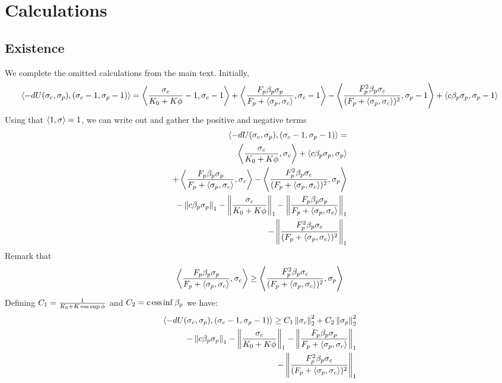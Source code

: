\section{Calculations}
\subsection{Existence}
\label{appendix:calculations}
We complete the omitted calculations from the main text. Initially,
\begin{equation}
  \label{eq:calc_app}
  \ip{-dU(\sigma_c,\sigma_p)}{(\sigma_c-1, \sigma_p-1)} = \ip{\frac{\sigma_c}{K_0 + K\phi} - 1}{\sigma_c
  - 1} + \ip{\frac{F_p\beta_p\sigma_p}{F_p + \ip{\sigma_p}{\sigma_c}}}{\sigma_c-1}
  - \ip{\frac{F_p^2\beta_p\sigma_c}{(F_p + \ip{\sigma_p}{\sigma_c})^2}}{\sigma_p - 1} + \ip{c \beta_p \sigma_p}{\sigma_p -1}
\end{equation}
Using that $\left \langle 1,\sigma \right \rangle = 1$, we can write out  and gather the positive and negative terms
\begin{equation}
  \begin{split}
  \ip{-dU(\sigma_c,\sigma_p)}{(\sigma_c-1, \sigma_p-1)} = \\
  \ip{\frac{\sigma_c}{K_0 + K\phi}}{\sigma_c} + \ip{c \beta_p \sigma_p}{\sigma_p} \\ + \ip{\frac{F_p\beta_p\sigma_p}{F_p + \ip{\sigma_p}{\sigma_c}}}{\sigma_c} - \ip{\frac{F_p^2\beta_p\sigma_c}{(F_p + \ip{\sigma_p}{\sigma_c})^2}}{\sigma_p} \\
  - \norm{c\beta_p \sigma_p}_1 - \norm{\frac{\sigma_c}{K_0 + K\phi}}_1 - \norm{\frac{F_p\beta_p\sigma_p}{F_p + \ip{\sigma_p}{\sigma_c}}}_1 \\
   - \norm{\frac{F_p^2\beta_p\sigma_c}{(F_p + \ip{\sigma_p}{\sigma_c})^2}}_1
\end{split}
\end{equation}
Remark that
\begin{equation}
  \left \langle \frac{F_p\beta_p\sigma_p}{F_p + \left \langle \sigma_p,\sigma_c \right \rangle},\sigma_c \right \rangle \geq \left \langle \frac{F_p^2\beta_p\sigma_c}{(F_p + \left \langle \sigma_p,\sigma_c \right \rangle)^2},\sigma_p \right \rangle
\end{equation}
Defining $C_1 = \frac{1}{K_0 + K \ess \sup \phi}$ and $C_2 = c \operatorname{ess} \inf \beta_p$ we have:
\begin{equation}
  \begin{split}
  \ip{-dU(\sigma_c,\sigma_p)}{(\sigma_c-1, \sigma_p-1)} \geq C_1 \norm{\sigma_c}^2_2 + C_2 \norm{\sigma_p}_2^2 \\
  - \norm{c\beta_p \sigma_p}_1 - \norm{\frac{\sigma_c}{K_0 + K\phi}}_1 - \norm{\frac{F_p\beta_p\sigma_p}{F_p + \ip{\sigma_p}{\sigma_c}}}_1 \\
   - \norm{\frac{F_p^2\beta_p\sigma_c}{(F_p + \ip{\sigma_p}{\sigma_c})^2}}_1
  \end{split}
\end{equation}
